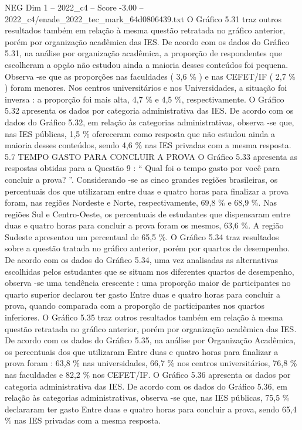 \begin{textsample}{NEG Dim 1 – 2022\_c4 – Score -3.00 – 2022\_c4/enade\_2022\_tec\_mark\_64d0806439.txt}
O Gráfico 5.31 traz outros resultados também em relação à mesma questão retratada no gráfico anterior, porém por organização acadêmica das IES.
De acordo com os dados do Gráfico 5.31, na análise por organização acadêmica, a proporção de respondentes que escolheram a opção não estudou ainda a maioria desses conteúdos foi pequena.
Observa -se que as proporções nas faculdades ( 3,6 \% ) e nas CEFET/IF ( 2,7 \% ) foram menores.
Nos centros universitários e nos Universidades, a situação foi inversa : a proporção foi mais alta, 4,7 \% e 4,5 \%, respectivamente.
O Gráfico 5.32 apresenta os dados por categoria administrativa das IES.
De acordo com os dados do Gráfico 5.32, em relação às categorias administrativas, observa -se que, nas IES públicas, 1,5 \% ofereceram como resposta que não estudou ainda a maioria desses conteúdos, sendo 4,6 \% nas IES privadas com a mesma resposta. 5.7 TEMPO GASTO PARA CONCLUIR A PROVA O Gráfico 5.33 apresenta as respostas obtidas para a Questão 9 : “ Qual foi o tempo gasto por você para concluir a prova? ”.
Considerando -se as cinco grandes regiões brasileiras, os percentuais dos que utilizaram entre duas e quatro horas para finalizar a prova foram, nas regiões Nordeste e Norte, respectivamente, 69,8 \% e 68,9 \%.
Nas regiões Sul e Centro-Oeste, os percentuais de estudantes que dispensaram entre duas e quatro horas para concluir a prova foram os mesmos, 63,6 \%.
A região Sudeste apresentou um percentual de 65,5 \%.
O Gráfico 5.34 traz resultados sobre a questão tratada no gráfico anterior, porém por quartos de desempenho.
De acordo com os dados do Gráfico 5.34, uma vez analisadas as alternativas escolhidas pelos estudantes que se situam nos diferentes quartos de desempenho, observa -se uma tendência crescente : uma proporção maior de participantes no quarto superior declarou ter gasto Entre duas e quatro horas para concluir a prova, quando comparada com a proporção de participantes nos quartos inferiores.
O Gráfico 5.35 traz outros resultados também em relação à mesma questão retratada no gráfico anterior, porém por organização acadêmica das IES.
De acordo com os dados do Gráfico 5.35, na análise por Organização Acadêmica, os percentuais dos que utilizaram Entre duas e quatro horas para finalizar a prova foram : 63,8 \% nas universidades, 66,7 \% nos centros universitários, 76,8 \% nas faculdades e 82,2 \% nos CEFET/IF.
O Gráfico 5.36 apresenta os dados por categoria administrativa das IES.
De acordo com os dados do Gráfico 5.36, em relação às categorias administrativas, observa -se que, nas IES públicas, 75,5 \% declararam ter gasto Entre duas e quatro horas para concluir a prova, sendo 65,4 \% nas IES privadas com a mesma resposta.

\end{textsample}

